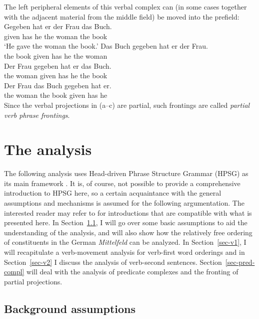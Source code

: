 {The left peripheral elements of this verbal complex can (in some cases together with the adjacent material
from the middle field) be moved into the prefield:
\eal
\ex
\gll Gegeben hat er der Frau das Buch.\\
     given has he the woman the book\\
\glt `He gave the woman the book.'
\ex
\gll Das Buch gegeben hat er der Frau.\\
     the book given   has he the woman\\
\ex
\gll Der Frau gegeben hat er das Buch.\\
     the woman given  has he the book\\
\ex
\gll Der Frau  das Buch gegeben hat er.\\
     the woman the book given   has he\\
\zl
Since the verbal projections in (a--c) are partial, such frontings are called \emph{partial verb
phrase frontings}.



\section{The analysis}
\label{sec-analysis-v1-v2}

The following analysis uses Head-driven Phrase Structure Grammar (HPSG) as its main framework \citep{ps2}. It is, of course,
not possible to provide a comprehensive introduction to HPSG here, so a certain acquaintance with the general assumptions and mechanisms is
assumed for the following argumentation. The interested reader may refer to
 for introductions that are
compatible with what is presented here. In Section~\ref{sec-annahmen}, I will go over some basic assumptions to aid the understanding of the analysis, and
will also show how the relatively free ordering of constituents in the German \emph{Mittelfeld} can be analyzed. In Section~\ref{sec-v1}, I will recapitulate a 
verb-movement analysis for verb-first word orderings and in Section~\ref{sec-v2} I discuss the analysis of verb-second sentences. Section~\ref{sec-pred-compl}
will deal with the analysis of predicate complexes and the fronting of partial projections.  


\subsection{Background assumptions}
\label{sec-annahmen}
\label{sec-scrambling-analysis}

}
